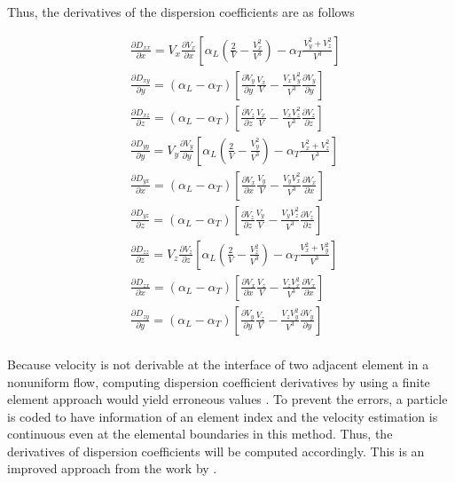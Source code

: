 Thus, the derivatives of the dispersion coefficients are as follows \cite{hH02}

\begin{equation}\label{DerivativeDispersionCoefficient}
\begin{array}{lllllllll}
& \frac{\partial D _{xx}}{\partial x}=V _x\frac{\partial V _x}{\partial x}\left [
\alpha _L \left (\frac {2}{V} - \frac {V _x ^2}{V^3} \right ) - \alpha _T \frac {V _y ^2 + V _z ^2}{V^3} \right ] \\
& \frac{\partial D _{xy}}{\partial y}=(\alpha _L - \alpha _T)\left [\frac{\partial V _y}{\partial y}
\frac{V _x}{V} - \frac{V _x V _y^2}{V^3} \frac{\partial V _y}{\partial y} \right ] \\
& \frac{\partial D _{xz}}{\partial z}=(\alpha _L - \alpha _T)\left [\frac{\partial V _z}{\partial z}
\frac{V _x}{V} - \frac{V _x V _z^2}{V^3} \frac{\partial V _z}{\partial z} \right ] \\
& \frac{\partial D _{yy}}{\partial y}=V _y\frac{\partial V _y}{\partial y}\left [
\alpha _L \left (\frac {2}{V} - \frac {V _y ^2}{V^3} \right ) - \alpha _T \frac {V _x ^2 + V _z ^2}{V^3} \right ] \\
& \frac{\partial D _{yx}}{\partial x}=(\alpha _L - \alpha _T)\left [\frac{\partial V _x}{\partial x}
\frac{V _y}{V} - \frac{V _y V _x^2}{V^3} \frac{\partial V _x}{\partial x} \right ] \\
& \frac{\partial D _{yz}}{\partial z}=(\alpha _L - \alpha _T)\left [\frac{\partial V _z}{\partial z}
\frac{V _y}{V} - \frac{V _y V _z^2}{V^3} \frac{\partial V _z}{\partial z} \right ] \\
& \frac{\partial D _{zz}}{\partial z}=V _z\frac{\partial V _z}{\partial z}\left [
\alpha _L \left (\frac {2}{V} - \frac {V _z ^2}{V^3} \right ) - \alpha _T \frac {V _x ^2 + V _y ^2}{V^3} \right ] \\
& \frac{\partial D _{zx}}{\partial x}=(\alpha _L - \alpha _T)\left [\frac{\partial V _x}{\partial x}
\frac{V _z}{V} - \frac{V _z V _x^2}{V^3} \frac{\partial V _x}{\partial x} \right ] \\
& \frac{\partial D _{zy}}{\partial y}=(\alpha _L - \alpha _T)\left [\frac{\partial V _y}{\partial y}
\frac{V _z}{V} - \frac{V _z V _y^2}{V^3} \frac{\partial V _y}{\partial y} \right ] \\
\end{array}
\end{equation}

Because velocity is not derivable at the interface of two adjacent element in a nonuniform flow, computing dispersion coefficient derivatives by using a finite element approach would yield erroneous values \cite{hH02}. To prevent the errors, a particle is coded to have information of an element index and the velocity estimation is continuous even at the elemental boundaries in this method. Thus, the derivatives of dispersion coefficients will be computed accordingly. This is an improved approach from the work by \cite{hH02}.


